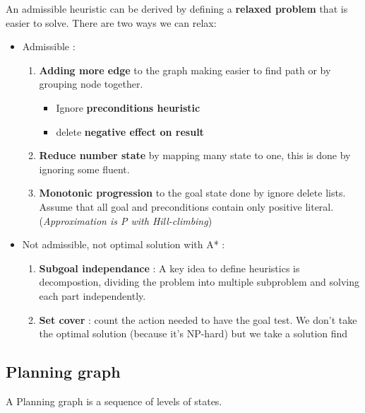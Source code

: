 An admissible heuristic can be derived by defining a \textbf{relaxed problem} that
is easier to solve. There are two ways we can relax:
\begin{itemize}
    \item Admissible :

    \begin{enumerate}
        \item \textbf{Adding more edge} to the graph
            making easier to find path or by grouping node together.
            \begin{itemize}
                \item Ignore \textbf{preconditions heuristic} 
                \item delete \textbf{negative effect on result}
            \end{itemize} 

        \item \textbf{Reduce  number state}  by mapping  many state  to one,
           this is done by ignoring some fluent.

       \item \textbf{Monotonic progression} to the goal state done by ignore delete
           lists.
           Assume that all goal and preconditions contain only positive literal.
           (\textit{Approximation is P with Hill-climbing})
    \end{enumerate}

    \item Not admissible, not optimal solution with A* :

        \begin{enumerate}
            \item \textbf{Subgoal independance} :
                A key  idea to define  heuristics is decompostion, dividing  the problem
                into multiple subproblem and solving each part independently.

            \item \textbf{Set cover} : count the action needed to have the goal test.
                We don't take the optimal solution (because it's NP-hard) but
                we take a solution find

        \end{enumerate}
\end{itemize}


\subsection{Planning graph}
A Planning graph is a sequence of levels of states.

